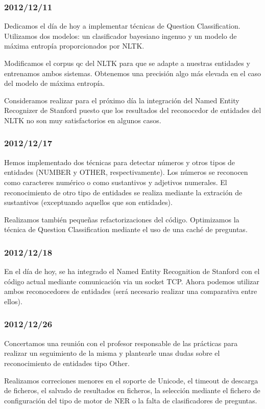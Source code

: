 \documentclass[12pt,a4paper,titlepage]{article}
\begin{document}
\subsubsection*{2012/12/11}
Dedicamos el día de hoy a implementar técnicas de Question Classification. Utilizamos dos modelos: un clasificador bayesiano ingenuo y un modelo de máxima entropía proporcionados por NLTK.

Modificamos el corpus qc del NLTK para que se adapte a nuestras entidades y entrenamos ambos sistemas. Obtenemos una precisión algo más elevada en el caso del modelo de máxima entropía.

Consideramos realizar para el próximo día la integración del Named Entity Recognizer de Stanford puesto que los resultados del reconocedor de entidades del NLTK no son muy satisfactorios en algunos casos.

\subsubsection*{2012/12/17}
Hemos implementado dos técnicas para detectar números y otros tipos de entidades (NUMBER y OTHER, respectivamente). Los números se reconocen como caracteres numérico o como sustantivos y adjetivos numerales. El reconocimiento de otro tipo de entidades se realiza mediante la extración de sustantivos (exceptuando aquellos que son entidades).

Realizamos también pequeñas refactorizaciones del código. Optimizamos la técnica de Question Classification mediante el uso de una caché de preguntas.

\subsubsection*{2012/12/18}
En el día de hoy, se ha integrado el Named Entity Recognition de Stanford con el código actual mediante comunicación via un socket TCP. Ahora podemos utilizar ambos reconocedores de entidades (será necesario realizar una comparativa entre ellos).

\subsubsection*{2012/12/26}
Concertamos una reunión con el profesor responsable de las prácticas para realizar un seguimiento de la misma y plantearle unas dudas sobre el reconocimiento de entidades tipo Other.

Realizamos correciones menores en el soporte de Unicode, el timeout de descarga de ficheros, el salvado de resultados en ficheros, la selección mediante el fichero de configuración del tipo de motor de NER o la falta de clasificadores de preguntas.
\end{document}
